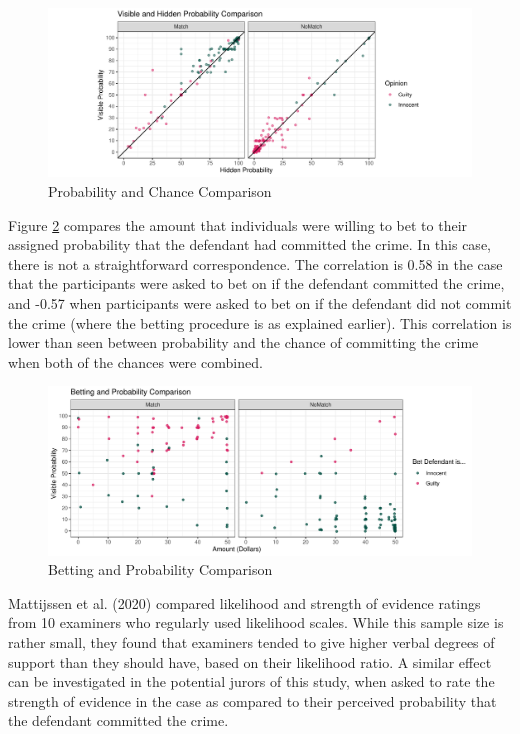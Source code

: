 \documentclass[print]{nuthesis}
\begin{document}
\begin{figure}

{\centering \includegraphics[width=\linewidth]{thesis_files/figure-latex/probcomp-1} 

}

\caption{Probability and Chance Comparison}\label{fig:probcomp}
\end{figure}

Figure \ref{fig:probbet} compares the amount that individuals were willing to bet to their assigned probability that the defendant had committed the crime.
In this case, there is not a straightforward correspondence.
The correlation is 0.58 in the case that the participants were asked to bet on if the defendant committed the crime, and -0.57 when participants were asked to bet on if the defendant did not commit the crime (where the betting procedure is as explained earlier).
This correlation is lower than seen between probability and the chance of committing the crime when both of the chances were combined.

\begin{figure}

{\centering \includegraphics[width=\linewidth]{thesis_files/figure-latex/probbet-1} 

}

\caption{Betting and Probability Comparison}\label{fig:probbet}
\end{figure}

Mattijssen et al. (2020) compared likelihood and strength of evidence ratings from 10 examiners who regularly used likelihood scales.
While this sample size is rather small, they found that examiners tended to give higher verbal degrees of support than they should have, based on their likelihood ratio.
A similar effect can be investigated in the potential jurors of this study, when asked to rate the strength of evidence in the case as compared to their perceived probability that the defendant committed the crime.
\end{document}
